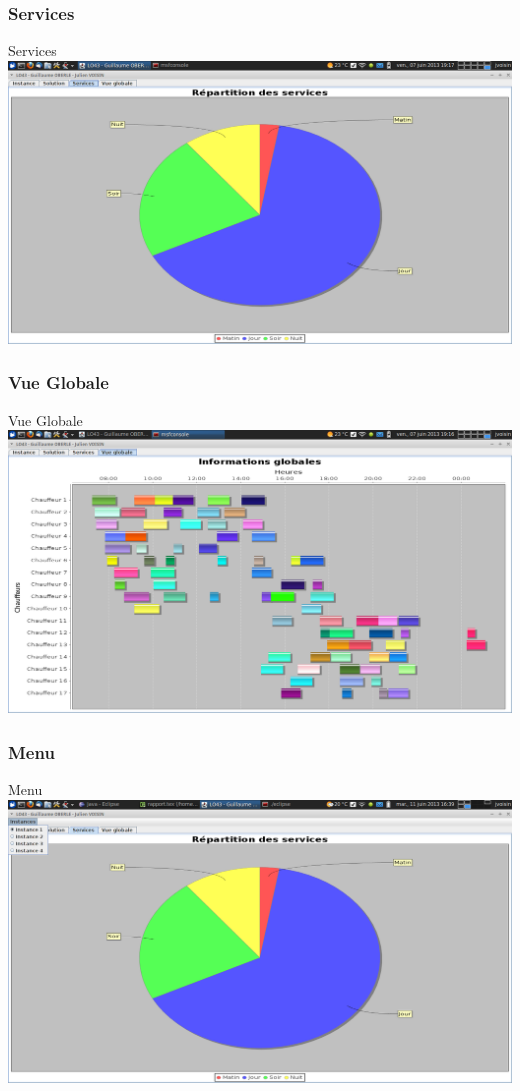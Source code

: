 \documentclass[xcolor=x11names,12pt,compress]{beamer}
\begin{document}
\subsubsection{Services}
\begin{frame}{Services}
    \includegraphics[width=\textwidth]{../rapport/services.png}
\end{frame}
\subsubsection{Vue Globale}
\begin{frame}{Vue Globale}
    \includegraphics[width=\textwidth]{../rapport/global.png}
\end{frame}
\subsubsection{Menu}
\begin{frame}{Menu}
    \includegraphics[trim = 0mm 16cm 27cm 0cm, clip, width=\textwidth]{../rapport/menu.png}
\end{frame}
\end{document}
